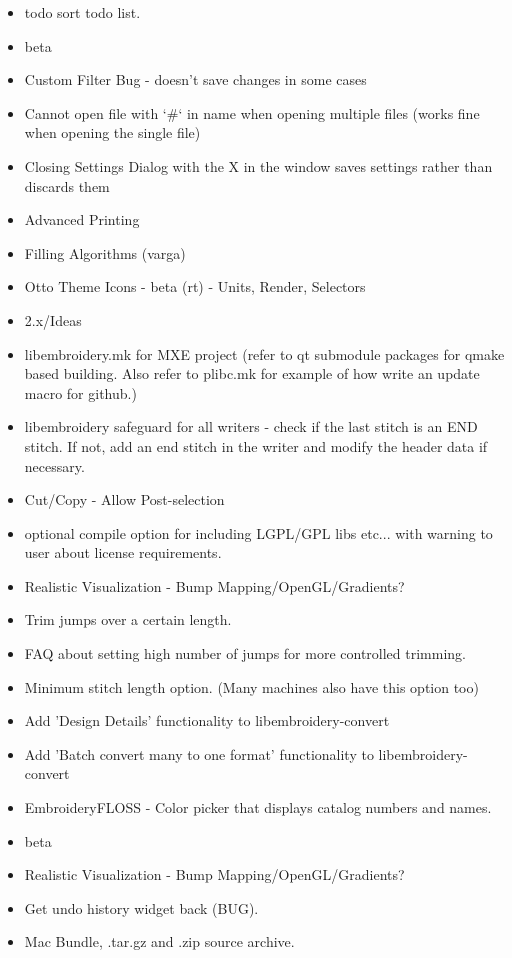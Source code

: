 \begin{itemize}
\item todo sort todo list.
\item beta
\item Custom Filter Bug - doesn't save changes in some cases
\item Cannot open file with `\#` in name when opening multiple files (works fine when opening the single file)
\item Closing Settings Dialog with the X in the window saves settings rather than discards them
\item Advanced Printing
\item Filling Algorithms (varga)
\item Otto Theme Icons - beta (rt) - Units, Render, Selectors
\item 2.x/Ideas
\item libembroidery.mk for MXE project (refer to qt submodule packages for qmake based building. Also refer to plibc.mk for example of how write an update macro for github.)
\item libembroidery safeguard for all writers - check if the last stitch is an END stitch. If not, add an end stitch in the writer and modify the header data if necessary.
\item Cut/Copy - Allow Post-selection
\item optional compile option for including LGPL/GPL libs etc... with warning to user about license requirements.
\item Realistic Visualization - Bump Mapping/OpenGL/Gradients?
\item Trim jumps over a certain length.
\item FAQ about setting high number of jumps for more controlled trimming.
\item Minimum stitch length option. (Many machines also have this option too)
\item Add 'Design Details' functionality to libembroidery-convert
\item Add 'Batch convert many to one format' functionality to libembroidery-convert
\item EmbroideryFLOSS - Color picker that displays catalog numbers and names.
\item beta
\item Realistic Visualization - Bump Mapping/OpenGL/Gradients?
\item Get undo history widget back (BUG).
\item Mac Bundle, .tar.gz and .zip source archive.

\end{itemize}
